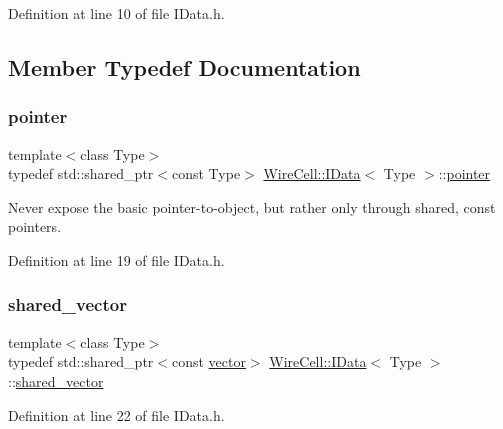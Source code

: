 Definition at line 10 of file I\+Data.\+h.



\subsection{Member Typedef Documentation}
\mbox{\label{class_wire_cell_1_1_i_data_aff870b3ae8333cf9265941eef62498bc}} 
\subsubsection{\texorpdfstring{pointer}{pointer}}
{\footnotesize\ttfamily template$<$class Type$>$ \\
typedef std\+::shared\+\_\+ptr$<$const Type$>$ \hyperlink{class_wire_cell_1_1_i_data}{Wire\+Cell\+::\+I\+Data}$<$ Type $>$\+::\hyperlink{class_wire_cell_1_1_i_data_aff870b3ae8333cf9265941eef62498bc}{pointer}}

Never expose the basic pointer-\/to-\/object, but rather only through shared, const pointers. 

Definition at line 19 of file I\+Data.\+h.

\mbox{\label{class_wire_cell_1_1_i_data_a6edac35e7dd886018740993b28c7ca1e}} 
\subsubsection{\texorpdfstring{shared\+\_\+vector}{shared\_vector}}
{\footnotesize\ttfamily template$<$class Type$>$ \\
typedef std\+::shared\+\_\+ptr$<$const \hyperlink{class_wire_cell_1_1_i_data_ae1a9f863380499bb43f39fabb6276660}{vector}$>$ \hyperlink{class_wire_cell_1_1_i_data}{Wire\+Cell\+::\+I\+Data}$<$ Type $>$\+::\hyperlink{class_wire_cell_1_1_i_data_a6edac35e7dd886018740993b28c7ca1e}{shared\+\_\+vector}}



Definition at line 22 of file I\+Data.\+h.

\mbox{\label{class_wire_cell_1_1_i_data_a8cd5758b536f009da111eefc54c20680}} 
